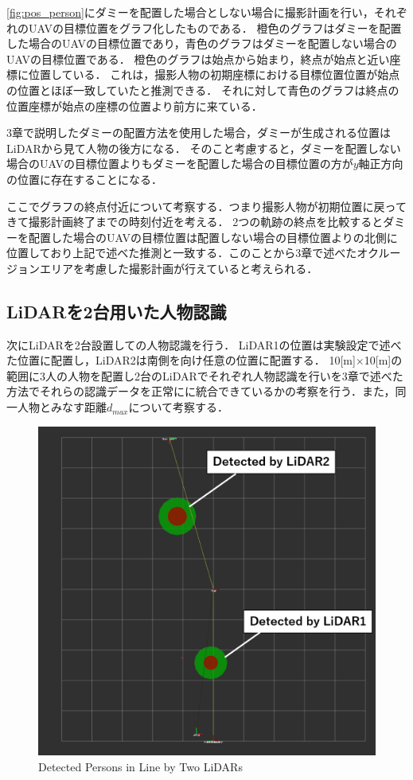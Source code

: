 \documentclass[autodetect-engine,dvipdfmx-if-dvi,ja=standard,a4j,jbase=11pt,magstyle=nomag*]{bxjsreport}
\begin{document}
\cref{fig:pos_person}にダミーを配置した場合としない場合に撮影計画を行い，それぞれのUAVの目標位置をグラフ化したものである．
橙色のグラフはダミーを配置した場合のUAVの目標位置であり，青色のグラフはダミーを配置しない場合のUAVの目標位置である．
橙色のグラフは始点から始まり，終点が始点と近い座標に位置している．
これは，撮影人物の初期座標における目標位置位置が始点の位置とほぼ一致していたと推測できる．
それに対して青色のグラフは終点の位置座標が始点の座標の位置より前方に来ている．

3章で説明したダミーの配置方法を使用した場合，ダミーが生成される位置はLiDARから見て人物の後方になる．
そのこと考慮すると，ダミーを配置しない場合のUAVの目標位置よりもダミーを配置した場合の目標位置の方が$y$軸正方向の位置に存在することになる．

ここでグラフの終点付近について考察する．つまり撮影人物が初期位置に戻ってきて撮影計画終了までの時刻付近を考える．
2つの軌跡の終点を比較するとダミーを配置した場合のUAVの目標位置は配置しない場合の目標位置よりの北側に位置しており上記で述べた推測と一致する．このことから3章で述べたオクルージョンエリアを考慮した撮影計画が行えていると考えられる．


\subsection{LiDARを2台用いた人物認識}
次にLiDARを2台設置しての人物認識を行う．
LiDAR1の位置は実験設定で述べた位置に配置し，LiDAR2は南側を向け任意の位置に配置する．
10[m]$\times$10[m]の範囲に3人の人物を配置し2台のLiDARでそれぞれ人物認識を行いを3章で述べた方法でそれらの認識データを正常にに統合できているかの考察を行う．また，同一人物とみなす距離$d_{max}$について考察する．

\begin{figure}[h]
    \centering
    \includegraphics[width=0.7\linewidth, clip]{./figure/chapter5/line.png}
    \caption{Detected Persons in Line by Two LiDARs}
    \label{fig:line}
\end{figure}
\end{document}
